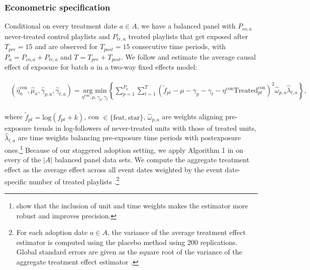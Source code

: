 \subsubsection{Econometric specification}
Conditional on every treatment date $a \in A$, we have a balanced panel with $P_{co,a}$ never-treated control playlists and $P_{tr,a}$ treated playlists that get exposed after $T_{pre} = 15$ and are observed for $T_{post} = 15$ consecutive time periods, with $P_a=P_{co,a}+P_{tr,a}$ and $T=T_{pre}+T_{post}$. We follow \cite{SDiD_AER_Arkhangelsky_21} and estimate the average causal effect of exposure for batch $a$ in a two-way fixed effects model:

\begin{align} 
\begin{split} 
\left(\hat{\eta}_a^{\text{con}}, \hat{\mu}_a, \hat{\gamma}_{p,a}, \hat{\gamma}_{t,a}\right) = \underset{\eta^{\text{con}},\mu, \gamma_{p}, \gamma_{t}}{\text{arg min}} \left\{\sum_{p=1}^{P_a} \sum_{t=1}^T \left( \tilde{f}_{pt} - \mu - \gamma_{p} - \gamma_{t} - \eta^{\text{con}} \text{Treated}_{pt}^{\text{con}} \right)^2 \hat{\omega}_{p,a} \hat{\lambda}_{t,a} \right\}, \end{split} 
\label{SDID_speci}
\end{align} 

where $\tilde{f}_{pt} = \text{log}(f_{pt}+k)$, con $\in \{\text{feat},\text{star}\}$, $\hat{\omega}_{p,a}$ are weights aligning pre-exposure trends in log-followers of never-treated units with those of treated units, $\hat{\lambda}_{t,a}$ are time weights balancing pre-exposure time periods with postexposure ones.\footnote{\cite{SDiD_AER_Arkhangelsky_21} show that the inclusion of unit and time weights makes the estimator more robust and improves precision.} Because of our staggered adoption setting, we apply Algorithm 1 in \cite{SDiD_AER_Arkhangelsky_21} on every of the $|A|$ balanced panel data sets. We compute the aggregate treatment effect as the average effect across all event dates weighted by the event date-specific number of treated playlists \citep{SDiD_AER_Arkhangelsky_21}.\footnote{For each adoption date $a \in A$, the variance of the average treatment effect estimator is computed using the placebo method \citep[Algorithm 4 in][]{SDiD_AER_Arkhangelsky_21} using 200 replications. Global standard errors are given as the square root of the variance of the aggregate treatment effect estimator \citep[e.g.,][]{Imbens_JoEconmetrics_22}.}%

